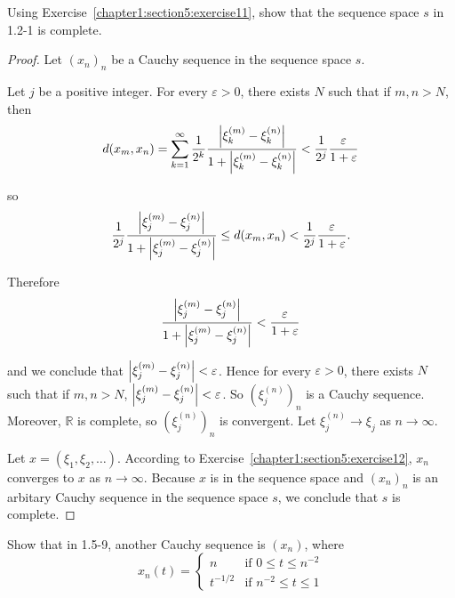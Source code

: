 \begin{exercise}\label{chapter1:section5:exercise12}
    Using Exercise~\ref{chapter1:section5:exercise11}, show that the sequence space $s$ in 1.2-1 is complete.
\end{exercise}

\begin{proof}
    Let ${(x_{n})}_{n}$ be a Cauchy sequence in the sequence space $s$.

    Let $j$ be a positive integer. For every $\varepsilon > 0$, there exists $N$ such that if $m, n > N$, then
    \[
        d(x_{m}, x_{n}) = \sum^{\infty}_{k=1}\frac{1}{2^{k}}\frac{\left\vert{\xi^{(m)}_{k} - \xi^{(n)}_{k}}\right\vert}{1 + \left\vert{\xi^{(m)}_{k} - \xi^{(n)}_{k}}\right\vert} < \frac{1}{2^{j}}\frac{\varepsilon}{1 + \varepsilon}
    \]

    so
    \[
        \frac{1}{2^{j}}\frac{\left\vert{\xi^{(m)}_{j} - \xi^{(n)}_{j}}\right\vert}{1 + \left\vert{\xi^{(m)}_{j} - \xi^{(n)}_{j}}\right\vert} \leq d(x_{m}, x_{n}) < \frac{1}{2^{j}}\frac{\varepsilon}{1 + \varepsilon}.
    \]

    Therefore
    \[
        \frac{\left\vert{\xi^{(m)}_{j} - \xi^{(n)}_{j}}\right\vert}{1 + \left\vert{\xi^{(m)}_{j} - \xi^{(n)}_{j}}\right\vert} < \frac{\varepsilon}{1 + \varepsilon}
    \]

    and we conclude that $\left\vert{\xi^{(m)}_{j} - \xi^{(n)}_{j}}\right\vert < \varepsilon$. Hence for every $\varepsilon > 0$, there exists $N$ such that if $m, n > N$, $\left\vert{\xi^{(m)}_{j} - \xi^{(n)}_{j}}\right\vert < \varepsilon$. So ${(\xi^{(n)}_{j})}_{n}$ is a Cauchy sequence. Moreover, $\mathbb{R}$ is complete, so ${(\xi^{(n)}_{j})}_{n}$ is convergent. Let $\xi^{(n)}_{j} \to \xi_{j}$ as $n\to\infty$.

    Let $x = (\xi_{1}, \xi_{2}, \ldots)$. According to Exercise~\ref{chapter1:section5:exercise12}, $x_{n}$ converges to $x$ as $n\to\infty$. Because $x$ is in the sequence space and ${(x_{n})}_{n}$ is an arbitary Cauchy sequence in the sequence space $s$, we conclude that $s$ is complete.
\end{proof}

\begin{exercise}\label{chapter1:section5:exercise13}
    Show that in 1.5-9, another Cauchy sequence is $(x_{n})$, where
    \[
        x_{n}(t) = \begin{cases}
            n        & \text{if $0\leq t\leq n^{-2}$} \\
            t^{-1/2} & \text{if $n^{-2}\leq t\leq 1$}
        \end{cases}
    \]
\end{exercise}

